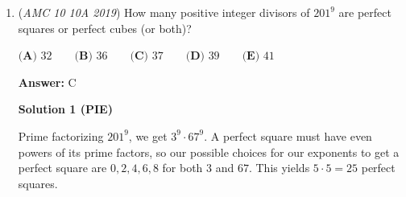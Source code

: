 \begin{enumerate}
 



\textbf{Solution 4 (Under 1 Minute)}

We can see that the big $10$ by $17$ rectangle can be split into $2$ smaller $5$ by $17$ rectangles. This means that the number of small rectangles is divisible by $2$. This also means that the number of small rectangles in the $5$ by $17$ rectangles is an odd number since it can't be divided into any smaller triangles. Thus the only number that meets the requirements is $\boxed{\textbf{(C) } 26}$. 

 



\textbf{Solution 5 (Cheese)}

In a $2$ by $3$ rectangle, the diagonal will go through $4$ squares. In a $3$ by $5$ rectangle, the diagonal will go through $7$ squares. In a $3$ by $4$ rectangle, the diagonal will go through $6$ squares. Therefore, it can be assumed that in a $x$ by $y$ rectangle, where $x$ and $y$ are relatively prime, the diagonal will go through $x+y-1$ squares. Hence, the answer is $10+17-1=\boxed{ \textbf{(C) } 26}.$




\textbf{Solution 6}

What counts as crossing a tile is if either: $x$ crosses a tiny boundary or $y$ crosses a tiny boundary. The bug, of course crosses $x$ boundary $10$ times and $y$ boundary $17$ times, $10 + 17 = 27$. However, we also must make sure we don't overcount; we'd overcount if the bug crosses the $x$ and $y$ boundary at the same time. This happens, so we must subtract $27 - 1 = \boxed{26}$.

 


 


	\item (\textit{AMC 10 10A 2019}) How many positive integer divisors of $201^9$ are perfect squares or perfect cubes (or both)?


 $\textbf{(A) } 32 \qquad\textbf{(B) } 36 \qquad\textbf{(C) } 37 \qquad\textbf{(D) } 39 \qquad\textbf{(E) } 41$

 \textbf{Answer: }C



\textbf{Solution 1 (PIE)}

Prime factorizing $201^9$, we get $3^9\cdot67^9$. A perfect square must have even powers of its prime factors, so our possible choices for our exponents to get a perfect square are $0, 2, 4, 6, 8$ for both $3$ and $67$. This yields $5\cdot5 = 25$ perfect squares. 


\end{enumerate}
